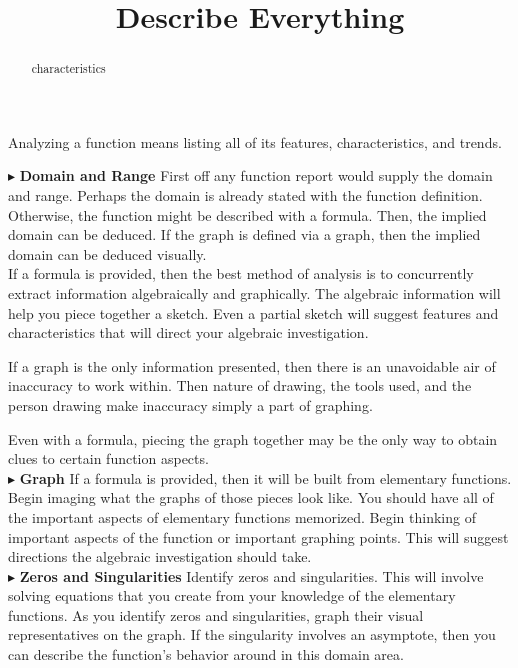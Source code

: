 \documentclass{ximera}
\title{Describe Everything}
\begin{document}
\begin{abstract}
characteristics
\end{abstract}
\maketitle




Analyzing a function means listing all of its features, characteristics, and trends.


$\blacktriangleright$ \textbf{Domain and Range}
First off any function report would supply the domain and range.  Perhaps the domain is already stated with the function definition. Otherwise, the function might be described with a formula. Then, the implied domain can be deduced.  If the graph is defined via a graph, then the implied domain can be deduced visually. \\

If a formula is provided, then the best method of analysis is to concurrently extract information algebraically and graphically.  The algebraic information will help you piece together a sketch.  Even a partial sketch will suggest features and characteristics that will direct your algebraic investigation.

If a graph is the only information presented, then there is an unavoidable air of inaccuracy to work within.  Then nature of drawing, the tools used, and the person drawing make inaccuracy simply a part of graphing.

Even with a formula, piecing the graph together may be the only way to obtain clues to certain function aspects. \\





$\blacktriangleright$ \textbf{Graph}
If a formula is provided, then it will be built from elementary functions.  Begin imaging what the graphs of those pieces look like. You should have all of the important aspects of elementary functions memorized. Begin thinking of important aspects of the function or important graphing points. This will suggest directions the algebraic investigation should take. \\




$\blacktriangleright$ \textbf{Zeros and Singularities}
Identify zeros and singularities.  This will involve solving equations that you create from your knowledge of the elementary functions. As you identify zeros and singularities, graph their visual representatives on the graph. If the singularity involves an asymptote, then you can describe the function's behavior around in this domain area.\\
\end{document}
